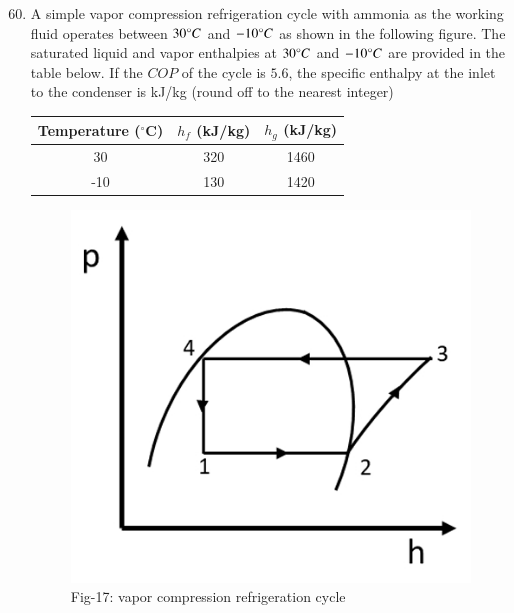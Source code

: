 \documentclass[journal]{IEEEtran}
\theoremstyle{remark}
\begin{document}
\begin{enumerate}[itemsep=1em]
\setcounter{enumi}{59}
\item A simple vapor compression refrigeration cycle with ammonia as the working fluid operates between $30\degree C$ and $-10\degree C$ as shown in the following figure. The saturated liquid and vapor enthalpies at $30\degree C$ and $-10\degree C$ are provided in the table below. If the $COP$ of the cycle is $5.6$, the specific enthalpy at the inlet to the condenser is \underline{\hspace{2cm}} kJ/kg (round off to the nearest integer) 
\begin{table}[h]
\centering
\begin{tabular}{|c|c|c|}
\hline
Temperature ($^\circ$C) & $h_f$ (kJ/kg) & $h_g$ (kJ/kg) \\
\hline
30 & 320 & 1460 \\
\hline
-10  & 130 & 1420 \\
\hline
\end{tabular}
\end{table}

\begin{figure}[H]
    \centering
    \includegraphics[width=0.4\columnwidth]{figs/fig-17.jpeg}
    \caption*{Fig-17: vapor compression refrigeration cycle}
    \label{fig-17}
\end{figure}
\end{enumerate}
\end{document}
